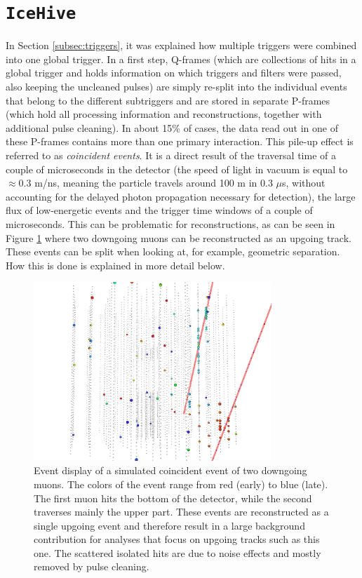 \section{\texttt{IceHive}}
\label{sec:icehive}
In Section \ref{subsec:triggers}, it was explained how multiple triggers were combined into one global trigger. In a first step, Q-frames (which are collections of hits in a global trigger and holds information on which triggers and filters were passed, also keeping the uncleaned pulses) are simply re-split into the individual events that belong to the different subtriggers and are stored in separate P-frames (which hold all processing information and reconstructions, together with additional pulse cleaning). In about 15\% of cases, the data read out in one of these P-frames contains more than one primary interaction. This pile-up effect is referred to as \textit{coincident events}. It is a direct result of the traversal time of a couple of microseconds in the detector (the speed of light in vacuum is equal to $\approx$0.3 m/ns, meaning the particle travels around 100 m in 0.3 $\mu$s, without accounting for the delayed photon propagation necessary for detection), the large flux of low-energetic events and the trigger time windows of a couple of microseconds. This can be problematic for reconstructions, as can be seen in Figure \ref{fig:coincidentevent} where two downgoing muons can be reconstructed as an upgoing track. These events can be split when looking at, for example, geometric separation. How this is done is explained in more detail below.\\

\begin{figure}[t]
\centering
\includegraphics[width=0.8\textwidth]{chapter7/img/coincidenteventsCORS.png}
\caption{Event display of a simulated coincident event of two downgoing muons. The colors of the event range from red (early) to blue (late). The first muon hits the bottom of the detector, while the second traverses mainly the upper part. These events are reconstructed as a single upgoing event and therefore result in a large background contribution for analyses that focus on upgoing tracks such as this one. The scattered isolated hits are due to noise effects and mostly removed by pulse cleaning.}
\label{fig:coincidentevent}
\end{figure}

